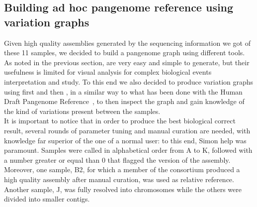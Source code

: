 \subsection{Building ad hoc pangenome reference using variation graphs}
Given high quality assemblies generated by the sequencing information we got of these 11 samples, we decided to build a pangenome graph using different tools. As noted in the previous section, \dbgs are very easy and simple to generate, but their usefulness is limited for visual analysis for complex biological events interpretation and study. To this end we also decided to produce variation graphs using first \pggb and then \mcactus, in a similar way to what has been done with the Human Draft Pangenome Reference~\cite{hdpr}, to then inspect the graph and gain knowledge of the kind of variations present between the samples. \\
It is important to notice that in order to produce the best biological correct result, several rounds of parameter tuning and manual curation are needed, with knowledge far superior of the one of a normal user: to this end, Simon help was paramount. Samples were called in alphabetical order from A to K, followed with a number greater or equal than 0 that flagged the version of the assembly. Moreover, one sample, B2, for which a member of the consortium produced a high quality assembly after manual curation, was used as relative reference. Another sample, J, was fully resolved into chromosomes while the others were divided into smaller contigs. \\
